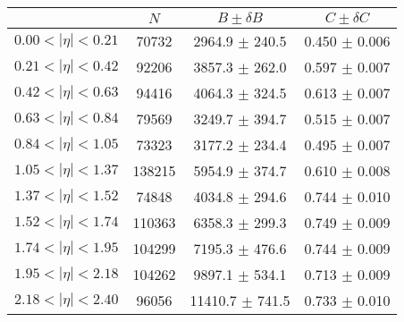 \begin{tabular}{lccc}
\hline
    &   $N$   & $B \pm \delta B$  &  $C \pm \delta C$ \\
\hline
$0.00 < |\eta| <0.21$          & 70732      & 2964.9     $\pm$ 240.5 & 0.450      $\pm$ 0.006 \\
$0.21 < |\eta| <0.42$          & 92206      & 3857.3     $\pm$ 262.0 & 0.597      $\pm$ 0.007 \\
$0.42 < |\eta| <0.63$          & 94416      & 4064.3     $\pm$ 324.5 & 0.613      $\pm$ 0.007 \\
$0.63 < |\eta| <0.84$          & 79569      & 3249.7     $\pm$ 394.7 & 0.515      $\pm$ 0.007 \\
$0.84 < |\eta| <1.05$          & 73323      & 3177.2     $\pm$ 234.4 & 0.495      $\pm$ 0.007 \\
$1.05 < |\eta| <1.37$          & 138215     & 5954.9     $\pm$ 374.7 & 0.610      $\pm$ 0.008 \\
$1.37 < |\eta| <1.52$          & 74848      & 4034.8     $\pm$ 294.6 & 0.744      $\pm$ 0.010 \\
$1.52 < |\eta| <1.74$          & 110363     & 6358.3     $\pm$ 299.3 & 0.749      $\pm$ 0.009 \\
$1.74 < |\eta| <1.95$          & 104299     & 7195.3     $\pm$ 476.6 & 0.744      $\pm$ 0.009 \\
$1.95 < |\eta| <2.18$          & 104262     & 9897.1     $\pm$ 534.1 & 0.713      $\pm$ 0.009 \\
$2.18 < |\eta| <2.40$          & 96056      & 11410.7    $\pm$ 741.5 & 0.733      $\pm$ 0.010 \\
\hline
\end{tabular}
